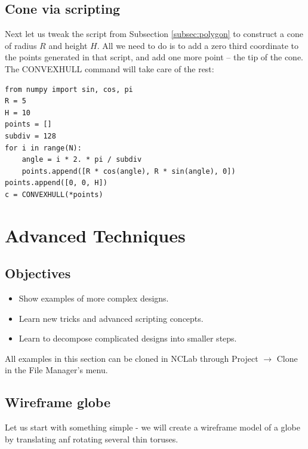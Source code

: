 \subsection{Cone via scripting}\label{par:cocon}

Next let us tweak the script
from Subsection \ref{subsec:polygon} to construct a cone of radius
$R$ and height $H$. All we need to do is to add a zero third coordinate 
to the points generated in that script, and add one more point -- the 
tip of the cone. The CONVEXHULL command will take care of the rest:\\

\begin{bbox}
\begin{verbatim}
from numpy import sin, cos, pi
R = 5
H = 10
points = []
subdiv = 128
for i in range(N):
    angle = i * 2. * pi / subdiv
    points.append([R * cos(angle), R * sin(angle), 0])
points.append([0, 0, H])
c = CONVEXHULL(*points)
\end{verbatim}
\end{bbox}
\noindent




\section{Advanced Techniques}

\subsection{Objectives}
\begin{itemize}
\item Show examples of more complex designs.
\item Learn new tricks and advanced scripting concepts.
\item Learn to decompose complicated designs into smaller steps.
\end{itemize}
All examples in this section can be cloned in NCLab through 
Project $\rightarrow$ Clone in the File Manager's menu.

\subsection{Wireframe globe}

Let us start with something simple - we will create a wireframe model 
of a globe by translating anf rotating several thin toruses.\\

